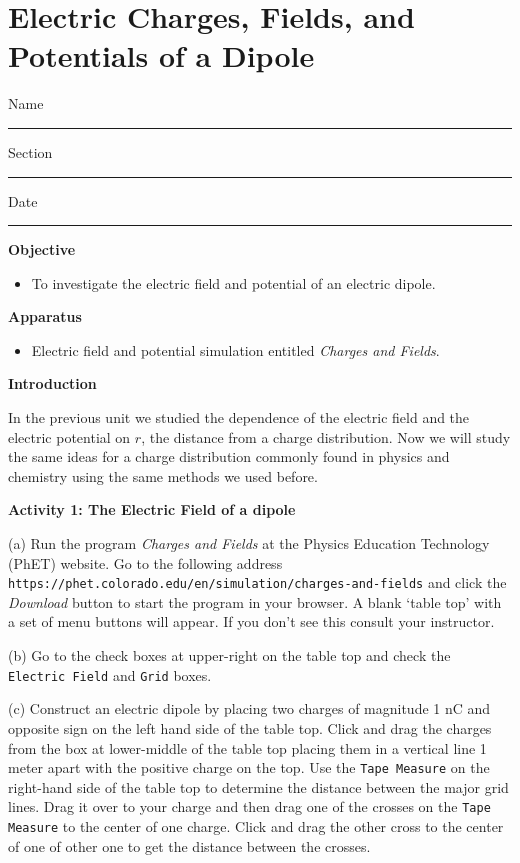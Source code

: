 
\section{Electric Charges, Fields, and Potentials of a Dipole}

Name \rule{2.0in}{0.1pt}\hfill{}Section \rule{1.0in}{0.1pt}\hfill{}Date
\rule{1.0in}{0.1pt}

\textbf{Objective}

\begin{itemize}
\item To investigate the electric field and potential of an electric dipole.
\end{itemize}

\textbf{Apparatus}

\begin{itemize}
\item Electric field and potential simulation entitled {\it Charges and Fields}.
\end{itemize}

\textbf{Introduction}

In the previous unit we studied the dependence
of the electric field and the electric potential on $r$, the distance from
a charge distribution.
Now we will study the same ideas for a charge distribution commonly found in physics and chemistry
using the same methods we used before.

\textbf{Activity 1: The Electric Field of a dipole}

(a) Run the program {\it Charges and Fields} at the Physics Education Technology (PhET)
website. Go to the following address {\tt https://phet.colorado.edu/en/simulation/charges-and-fields}
and click the {\it Download} button to start the program in your browser.
A blank `table top' with a set of menu buttons will appear. 
If you don't see this consult your instructor.

(b) Go to the check boxes at upper-right on the table top and check the {\tt Electric Field}
and {\tt Grid} boxes.

(c) Construct an electric dipole by placing two charges of magnitude 1 nC and opposite sign
on the left hand side of the table top.
Click and drag the charges 
from the box at lower-middle of the table top placing them in a vertical 
line 1 meter apart with the positive charge on the top. 
Use the {\tt Tape Measure} on the right-hand side of the table top
to determine the distance between the major grid lines.
Drag it over to your charge and then 
drag one of the crosses on the {\tt Tape Measure} to the center of one charge.
Click and drag the other cross to the center of one of other one to get
the distance between the crosses.

